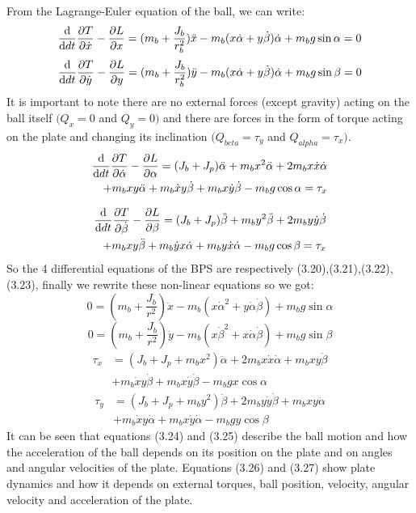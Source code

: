 From the Lagrange-Euler equation of the ball, we can write:
\begin{equation}
    \dv{}{dt} \pdv{T}{\dot{x}} - \pdv{L}{x} =(m_{b}+\frac{J_{b}}{r_{b}^{2}})\ddot{x}-m_{b}(x\dot{\alpha}+y\dot{\beta})\dot{\alpha}+m_{b}g\sin\alpha=0
\end{equation} 
\begin{equation}
\dv{}{dt} \pdv{T}{\dot{y}} - \pdv{L}{y} =(m_{b}+\frac{J_{b}}{r_{b}^{2}})\ddot{y}-m_{b}(x\dot{\alpha}+y\dot{\beta})\dot{\alpha}+m_{b}g\sin\beta=0
\end{equation}
It is important to note there are no external forces (except gravity) acting on the ball itself
$(Q_x = 0$ and $Q_y = 0)$ and there are forces in the form of torque acting on the plate and changing its inclination $(Q_{beta} = \tau_y $ and $ Q_{alpha} =\tau_x )$. 
\begin{align} \label{eq:asdf}
\dv{}{dt} \pdv{T}{\dot{\alpha}} - \pdv{L}{\alpha} = 
(J_b + J_p)\ddot{\alpha} + m_bx^2\ddot{\alpha} + 2m_bx\dot{x}\dot{\alpha}\\ \nonumber
+m_bxy\ddot{\alpha} +m_b\dot{x}y\dot{\beta} + m_bx\dot{y}\dot{\beta} - m_bg\cos{\alpha}
=\tau_x   
\end{align}

\begin{align} \label{eq:asdf}
\dv{}{dt} \pdv{T}{\dot{\beta}} - \pdv{L}{\beta} = 
(J_b + J_p)\ddot{\beta} + m_by^2\ddot{\beta} + 2m_by\dot{y}\dot{\beta}\\ \nonumber
+m_bxy\ddot{\beta} +m_b\dot{y}x\dot{\alpha} + m_by\dot{x}\dot{\alpha} - m_bg\cos{\beta}
=\tau_x  
\end{align}
So the 4 differential equations of the BPS are respectively (3.20),(3.21),(3.22),(3.23), finally we rewrite these non-linear equations so we got:
\begin{equation}
    0 =\left( m_b + \frac{J_b}{r^2} \right)\ddot{x} - m_b \left( x\dot{\alpha}^2 + y\dot{\alpha}\dot{\beta}\right) + m_bg\sin{\alpha}
\end{equation}
\begin{equation}
    0 = \left( m_b + \frac{J_b}{r^2} \right)\ddot{y} - m_b \left(  x\dot{\beta}^2 + x\dot{\alpha}\dot{\beta}\right) + m_bg\sin{\beta} 
\end{equation}
\begin{align}\label{eq:asdf}
\tau_x &= 
(J_b + J_p + m_bx^2)\ddot{\alpha}  + 2m_bx\dot{x}\dot{\alpha} +m_bxy\ddot{\beta}\\ \nonumber
&+m_b\dot{x}y\dot{\beta} + m_bx\dot{y}\dot{\beta} - m_bgx\cos{\alpha}
\end{align}
\begin{align}\label{eq:asdf}
\tau_y &= 
(J_b + J_p + m_by^2)\ddot{\beta}  + 2m_by\dot{y}\dot{\beta} +m_bxy\ddot{\alpha}\\ \nonumber
&+m_b\dot{x}y\dot{\alpha} + m_bx\dot{y}\dot{\alpha} - m_bgy\cos{\beta}
\end{align}
It can be seen that equations (3.24) and (3.25) describe the ball motion and how the acceleration of the ball depends on its position on the plate and on angles and angular velocities of the plate. Equations (3.26) and (3.27) show plate dynamics and how it depends on external torques, ball position, velocity, angular velocity and acceleration of the plate.

